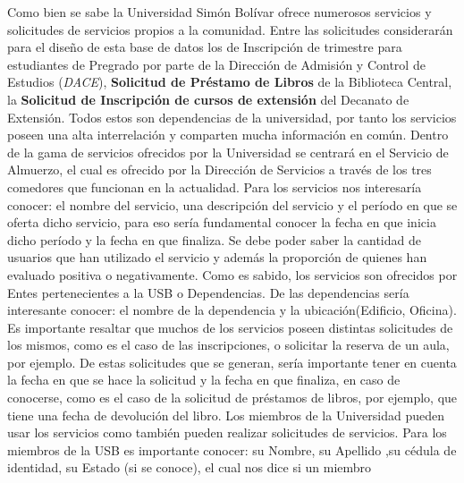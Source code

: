 \message{ !name(InformeFase2.tex)}\documentclass[12pt,a4paper,spanish]{article}
\begin{document}
\indent Como bien se sabe la Universidad Sim\'on Bol\'ivar ofrece
numerosos servicios y solicitudes de servicios propios a la
comunidad. Entre las solicitudes considerar\'an para el dise\~no de esta base de datos los de Inscripci\'on de trimestre para
estudiantes de Pregrado por parte de la Direcci\'on de Admisi\'on y Control de Estudios (\emph{DACE}),
\textbf {Solicitud de Pr\'estamo de Libros} de la Biblioteca
Central, la \textbf{Solicitud de Inscripci\'on de cursos de extensi\'on} del Decanato de Extensi\'on. Todos estos son dependencias
de la universidad, por tanto los servicios poseen una alta
interrelaci\'on y comparten mucha informaci\'on en com\'un. Dentro de
la gama de servicios ofrecidos por la Universidad se centrar\'a en el
Servicio de Almuerzo, el cual es ofrecido por la Direcci\'on de
Servicios a trav\'es de los tres comedores que funcionan en la actualidad.
\newline
\newline
\indent Para los servicios nos interesar\'ia conocer: el nombre del
servicio, una descripci\'on del servicio y el per\'iodo en que se
oferta dicho servicio, para eso ser\'ia fundamental conocer la fecha
en que inicia dicho per\'iodo y la fecha en que finaliza. Se debe poder saber la cantidad de usuarios
que han utilizado el servicio y adem\'as la proporci\'on de quienes han evaluado positiva o negativamente.
\newline
\newline
\indent Como es sabido, los servicios son ofrecidos por Entes
pertenecientes a la USB o Dependencias. De las dependencias ser\'ia
interesante conocer: el nombre de la dependencia y la
ubicaci\'on(Edificio, Oficina).
\newline
\newline
\indent Es importante resaltar que muchos de los servicios poseen
distintas solicitudes de los mismos, como es el caso de las
inscripciones, o solicitar la reserva de un aula, por ejemplo. De
estas solicitudes que se generan, ser\'ia importante tener en cuenta
la fecha en que se hace la solicitud y la fecha en que finaliza, en
caso de conocerse, como es el caso de la solicitud de pr\'estamos de
libros, por ejemplo, que tiene una fecha de devoluci\'on del libro.
\newline
\newline
\indent Los miembros de la Universidad pueden usar los servicios como
tambi\'en pueden realizar solicitudes de servicios. Para los miembros
de la USB es importante conocer: su Nombre, su Apellido ,su c\'edula
de identidad, su Estado (si se conoce), el cual nos dice si un miembro
\end{document}
